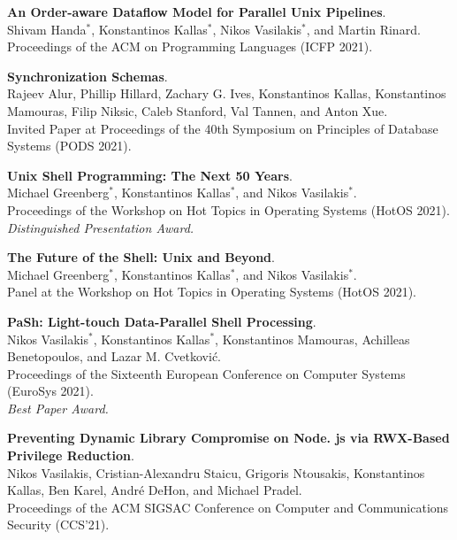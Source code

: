 \begin{minipage}{\textwidth}
\textbf{An Order-aware Dataflow Model for Parallel Unix Pipelines}. \\
Shivam Handa$^*$, Konstantinos Kallas$^*$, Nikos Vasilakis$^*$, and Martin Rinard. \\
Proceedings of the ACM on Programming Languages (ICFP 2021).
\end{minipage}

\begin{minipage}{\textwidth}
\textbf{Synchronization Schemas}. \\
Rajeev Alur, Phillip Hillard, Zachary G. Ives, Konstantinos Kallas, Konstantinos Mamouras, Filip Niksic, Caleb Stanford, Val Tannen, and Anton Xue. \\
Invited Paper at Proceedings of the 40th Symposium on Principles of Database Systems (PODS 2021).
\end{minipage}

\begin{minipage}{\textwidth}
\textbf{Unix Shell Programming: The Next 50 Years}. \\
Michael Greenberg$^*$, Konstantinos Kallas$^*$, and Nikos Vasilakis$^*$. \\
Proceedings of the Workshop on Hot Topics in Operating Systems (HotOS 2021).\\
 \emph{Distinguished Presentation Award.}
\end{minipage}

\begin{minipage}{\textwidth}
\textbf{The Future of the Shell: Unix and Beyond}. \\
Michael Greenberg$^*$, Konstantinos Kallas$^*$, and Nikos Vasilakis$^*$. \\
Panel at the Workshop on Hot Topics in Operating Systems (HotOS 2021).
\end{minipage}

\begin{minipage}{\textwidth}
\textbf{PaSh: Light-touch Data-Parallel Shell Processing}. \\
Nikos Vasilakis$^*$, Konstantinos Kallas$^*$, Konstantinos Mamouras, Achilleas Benetopoulos, and Lazar M. Cvetković. \\
Proceedings of the Sixteenth European Conference on Computer Systems (EuroSys 2021).\\
 \emph{Best Paper Award.}
\end{minipage}

\begin{minipage}{\textwidth}
\textbf{Preventing Dynamic Library Compromise on Node. js via RWX-Based Privilege Reduction}. \\
Nikos Vasilakis, Cristian-Alexandru Staicu, Grigoris Ntousakis, Konstantinos Kallas, Ben Karel, André DeHon, and Michael Pradel. \\
Proceedings of the ACM SIGSAC Conference on Computer and Communications Security (CCS’21).
\end{minipage}

